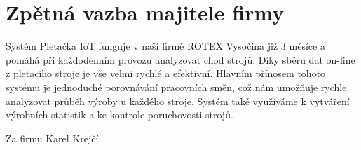 \chapter{Zpětná vazba majitele firmy}
Systém Pletačka IoT funguje v naší firmě ROTEX Vysočina již 3 měsíce a pomáhá při každodenním provozu analyzovat chod strojů.
Díky sběru dat on-line z pletacího stroje je vše velmi rychlé a efektivní.
Hlavním přínosem tohoto systému je jednoduché porovnávání pracovních směn, což nám umožňuje rychle analyzovat průběh výroby u každého stroje.
Systém také využíváme k vytváření výrobních statistik a ke kontrole poruchovosti strojů.

{\raggedleft Za firmu Karel Krejčí\par}



\newpage